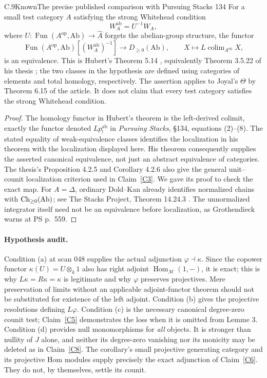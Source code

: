 \begin{claim}{C.9}{Known}{The precise published comparison with Pursuing Stacks 134}\label{C9}
For a small test category $A$ satisfying the strong Whitehead condition
\[
 W_A^{\mathrm{ab}}=U^{-1}W_A,
\]
where $U:\operatorname{Fun}(A^{\mathrm{op}},\mathrm{Ab})\to\widehat A$ forgets the abelian-group structure, the functor
\[
 \operatorname{Fun}(A^{\mathrm{op}},\mathrm{Ab})
 [(W_A^{\mathrm{ab}})^{-1}]
 \longrightarrow D_{\geq0}(\mathrm{Ab}),\qquad
 X\longmapsto L\operatorname{colim}_{A^{\mathrm{op}}}X,
\]
is an equivalence. This is Hubert's Theorem 5.14 \citep{Hubert2026}, equivalently Theorem 3.5.22 of his thesis \citep{Hubert2025}; the two classes in the hypothesis are defined using categories of elements and total homology, respectively. The assertion applies to Joyal's $\Theta$ by Theorem 6.15 of the article. It does not claim that every test category satisfies the strong Whitehead condition.
\end{claim}
\begin{proof}
The homology functor in Hubert's theorem is the left-derived colimit, exactly the functor denoted $Lp_!^{\mathrm{ab}}$ in \emph{Pursuing Stacks}, \S134, equations (2)--(8). The stated equality of weak-equivalence classes identifies the localization in his theorem with the localization displayed here. His theorem consequently supplies the asserted canonical equivalence, not just an abstract equivalence of categories. The thesis's Proposition 4.2.5 and Corollary 4.2.6 also give the general unit--counit localization criterion used in Claim~\ref{C3}. We gave its proof to check the exact map. For $A=\Delta$, ordinary Dold--Kan already identifies normalized chains with $\operatorname{Ch}_{\geq0}(\mathrm{Ab})$; see The Stacks Project, Theorem 14.24.3 \citep{StacksDK}. The unnormalized integrator itself need not be an equivalence before localization, as Grothendieck warns at PS p.~559.
\end{proof}

\paragraph{Hypothesis audit.}
Condition (a) at scan 048 supplies the actual adjunction $\varphi\dashv\kappa$. Since the copower functor $\kappa(U)=U\otimes_k1$ also has right adjoint $\operatorname{Hom}_{\mathcal M}(1,-)$, it is exact; this is why $L\kappa=R\kappa=\kappa$ is legitimate and why $\varphi$ preserves projectives. Mere preservation of limits without an applicable adjoint-functor theorem should not be substituted for existence of the left adjoint. Condition (b) gives the projective resolutions defining $L\varphi$. Condition (c) is the necessary canonical degree-zero counit test; Claim~\ref{C5} demonstrates the loss when it is omitted from Lemme 3. Condition (d) provides null monomorphisms for \emph{all} objects. It is stronger than nullity of $J$ alone, and neither its degree-zero vanishing nor its monicity may be deleted as in Claim~\ref{C8}. The corollary's small projective generating category and its projective Hom modules supply precisely the exact adjunction of Claim~\ref{C6}. They do not, by themselves, settle its counit.

